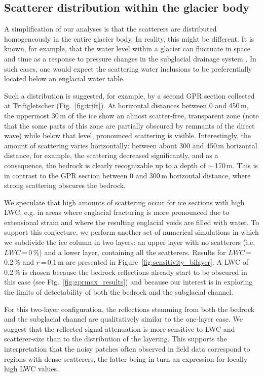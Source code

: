 \subsection{Scatterer distribution within the glacier body}

A simplification of our analyses is that the scatterers are distributed homogeneously in the entire glacier body. In reality, this might be different. It is known, for example, that the water level within a glacier can fluctuate in space and time as a response to pressure changes in the subglacial drainage system \citep[e.g][]{Iken&al1996,Werder&al2010,Rada&Shoof2018,Graff&Walter2021}. In such cases, one would expect the scattering water inclusions to be preferentially located below an englacial water table. 

Such a distribution is suggested, for example, by a second GPR section collected at Triftgletscher (Fig.~\ref{fig:trift}). At horizontal distances between 0 and 450\,m, the uppermost 30\,m of the ice show an almost scatter-free, transparent zone (note that the some parts of this zone are partially obscured by remnants of the direct wave) while below that level, pronounced scattering is visible. Interestingly, the amount of scattering varies horizontally: between about 300 and 450\,m horizontal distance, for example, the scattering decreased significantly, and as a consequence, the bedrock is clearly recognizable up to a depth of $\sim$\,170\,m. This is in contrast to the GPR section between 0 and 300\,m horizontal distance, where strong scattering obscures the bedrock.

We speculate that high amounts of scattering occur for ice sections with high LWC, e.g. in areas where englacial fracturing is more pronounced due to extensional strain \citep{Bradford&al2009} and where the resulting englacial voids are filled with water. To support this conjecture, we perform another set of numerical simulations in which we subdivide the ice column in two layers: an upper layer with no scatterers (i.e. $LWC$\,=\,0\,\%) and a lower layer, containing all the scatterers. Results for $LWC$\,=\,0.2\,\% and $r$\,=\,0.1\,m are presented in Figure~\ref{fig:sensitivity_bilayer}. A LWC of 0.2\,\% is chosen because the bedrock reflections already start to be obscured in this case  (see Fig.~\ref{fig:gprmax_results}) and because our interest is in exploring the limits of detectability of both the bedrock and the subglacial channel.

For this two-layer configuration, the reflections stemming from both the bedrock and the subglacial channel are qualitatively similar to the one-layer case. We suggest that the reflected signal attenuation is more sensitive to LWC and scatterer-size than to the distribution of the layering. This supports the interpretation that the noisy patches often observed in field data correspond to regions with dense scatterers, the latter being in turn an expression for locally high LWC values. 


